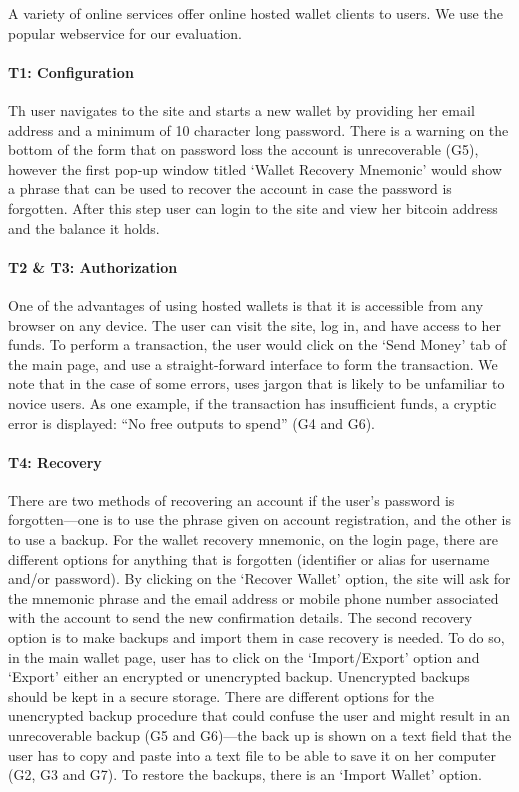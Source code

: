 A variety of online services offer online hosted wallet clients to users. We use the popular \block webservice for our evaluation.

\paragraph{T1: Configuration} 

Th user navigates to the \block site and starts a new wallet by providing her email address and a minimum of 10 character long password. There is a warning on the bottom of the form that on password loss the account is unrecoverable (G5), however the first pop-up window titled `Wallet Recovery Mnemonic' would show a phrase that can be used to recover the account in case the password is forgotten. After this step user can login to the site and view her bitcoin address and the balance it holds.

\paragraph{T2 \& T3: Authorization}
\label{hosted transaction}

One of the advantages of using hosted wallets is that it is accessible from any browser on any device. The user can visit the site, log in, and have access to her funds. To perform a transaction, the user would click on the `Send Money' tab of the main page, and use a straight-forward interface to form the transaction. We note that in the case of some errors, \block uses jargon that is likely to be unfamiliar to novice users. As one example, if the transaction has insufficient funds, a cryptic error is displayed: ``No free outputs to spend'' (G4 and G6).

\paragraph{T4: Recovery}

There are two methods of recovering an account if the user's password is forgotten---one is to use the phrase given on account registration, and the other is to use a backup. For the wallet recovery mnemonic, on the login page, there are different options for anything that is forgotten (identifier or alias for username and/or password). By clicking on the `Recover Wallet' option, the site will ask for the mnemonic phrase and the email address or mobile phone number associated with the account to send the new confirmation details. The second recovery option is to make backups and import them in case recovery is needed. To do so, in the main wallet page, user has to click on the `Import/Export' option and `Export' either an encrypted or unencrypted backup. Unencrypted backups should be kept in a secure storage. There are different options for the unencrypted backup procedure that could confuse the user and might result in an unrecoverable backup (G5 and G6)---the back up is shown on a text field that the user has to copy and paste into a text file to be able to save it on her computer (G2, G3 and G7). To restore the backups, there is an `Import Wallet' option.


